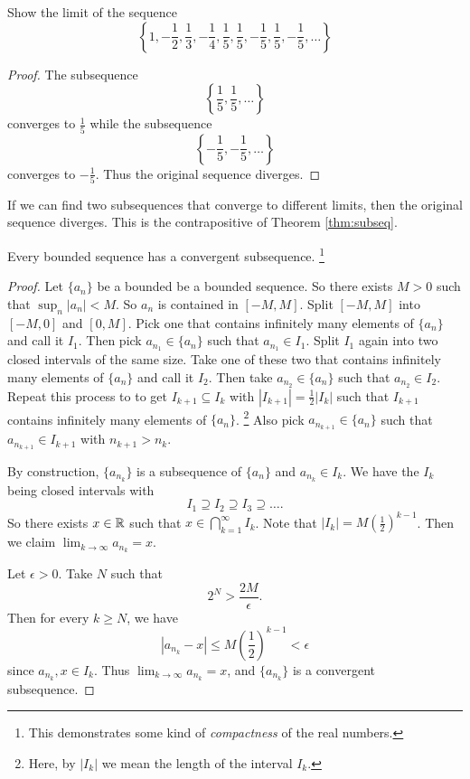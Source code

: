 \begin{exercise}
  Show the limit of the sequence
  \[
    \left\{1, -\frac{1}{2}, \frac{1}{3}, -\frac{1}{4}, \frac{1}{5}, \frac{1}{5}, -\frac{1}{5}, \frac{1}{5}, -\frac{1}{5}, \dots\right\}
  \]
\end{exercise}

\begin{proof}
  The subsequence
  \[\left\{\frac{1}{5}, \frac{1}{5}, \dots\right\}\]
  converges to $\frac{1}{5}$ while the subsequence
  \[\left\{-\frac{1}{5}, -\frac{1}{5}, \dots\right\}\]
  converges to $-\frac{1}{5}$. Thus the original
  sequence diverges.
\end{proof}

\begin{remark}
  If we can find two subsequences that converge to different
  limits, then the original sequence diverges.
  This is the contrapositive of Theorem \ref{thm:subseq}.
\end{remark}

\begin{theorem}
  Every bounded sequence has a convergent subsequence.
  \footnote{This demonstrates some kind of
    \textit{compactness} of the real numbers.}
\end{theorem}

\begin{proof}
  Let $\{a_n\}$ be a bounded  be a bounded sequence.
  So there exists $M > 0$ such that $\sup_{n} |a_n| < M$.
  So $a_n$ is contained in $[-M, M]$. Split
  $[-M, M]$ into $[-M, 0]$ and $[0, M]$.
  Pick one that contains infinitely many elements of
  $\{a_n\}$ and call it $I_1$. Then pick
  $a_{n_1} \in \{a_n\}$ such that $a_{n_1} \in I_1$.
  Split $I_1$ again into two closed intervals of
  the same size. Take one of these two that contains
  infinitely many elements of $\{a_n\}$ and call it $I_2$.
  Then take $a_{n_2} \in \{a_n\}$ such that
  $a_{n_2} \in I_2$. Repeat this process to to get
  $I_{k+1} \subseteq I_k$ with
  $|I_{k+1}| = \frac{1}{2}|I_k|$ such that $I_{k+1}$
  contains infinitely many elements of $\{a_n\}$.
  \footnote{Here, by $|I_k|$ we mean the length of the
    interval $I_k$.}
  Also pick $a_{n_{k+1}} \in \{a_n\}$ such that
  $a_{n_{k+1}} \in I_{k+1}$ with $n_{k + 1} > n_k$.
  
  By construction, $\{a_{n_k}\}$ is a subsequence of
  $\{a_n\}$ and $a_{n_k} \in I_k$. We have the
  $I_k$ being closed intervals with
  \[
  I_1 \supseteq I_2 \supseteq I_3 \supseteq \dots
  .\]
  So there exists $x \in \mathbb{R}$ such that
  $x \in \bigcap_{k = 1}^{\infty} I_k$. Note that
  $|I_k| = M\left(\frac{1}{2}\right)^{k-1}$. Then we claim
  $\lim_{k \to \infty} a_{n_k} = x$.

  Let $\epsilon > 0$. Take $N$ such that
  \[2^N > \frac{2M}{\epsilon}.\]
  Then for every $k \ge N$, we have
  \[
    |a_{n_k} - x| \le M \left(\frac{1}{2}\right)^{k - 1}
    < \epsilon
  \]
  since $a_{n_k}, x \in I_k$.
  Thus $\lim_{k \to \infty} a_{n_k} = x$, and
  $\{a_{n_k}\}$ is a convergent subsequence.
\end{proof}

